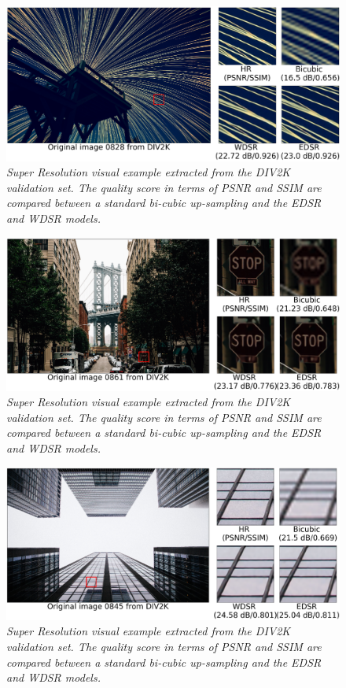 \documentclass[12pt,a4paper]{report}
\begin{document}
\begin{figure}[H]
  \includegraphics[scale=0.5]{images/sr_res1.png}
    \caption{\it Super Resolution visual example extracted from the DIV2K validation set. The quality score in terms of PSNR and SSIM are compared between a standard bi-cubic up-sampling and the EDSR and WDSR models.}
  \label{fig:sky}
\end{figure}

\begin{figure}[H]
  \includegraphics[scale=0.5]{images/sr_res2.png}
    \caption{\it Super Resolution visual example extracted from the DIV2K validation set. The quality score in terms of PSNR and SSIM are compared between a standard bi-cubic up-sampling and the EDSR and WDSR models.}
  \label{fig:city}
\end{figure}

\begin{figure}[H]
  \includegraphics[scale=0.5]{images/sr_res3.png}
  \caption{\it Super Resolution visual example extracted from the DIV2K validation set. The quality score in terms of PSNR and SSIM are compared between a standard bi-cubic up-sampling and the EDSR and WDSR models.}
  \label{fig:windows}
\end{figure}
\end{document}
